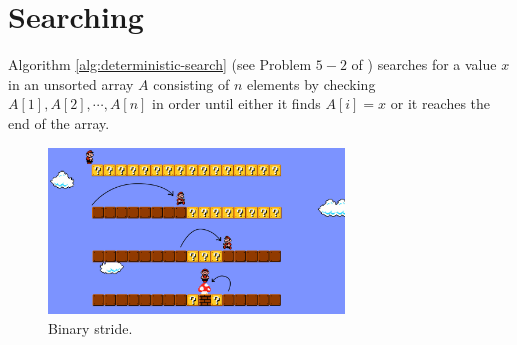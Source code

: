 
\chapter{Searching}	\label{chapter:searching}

Algorithm \ref{alg:deterministic-search} (see Problem $5-2$ of \cite{CLRS09})
searches for a value $x$ in an unsorted array $A$ consisting of $n$ elements 
by checking $A[1], A[2], \cdots, A[n]$ in order until either it finds $A[i] = x$
or it reaches the end of the array.



\begin{figure}
  \centering
  \includegraphics[width = 0.70\textwidth]{figs/binary-stride}
  \caption{Binary stride.}
  \label{fig:binary-stride}
\end{figure}



